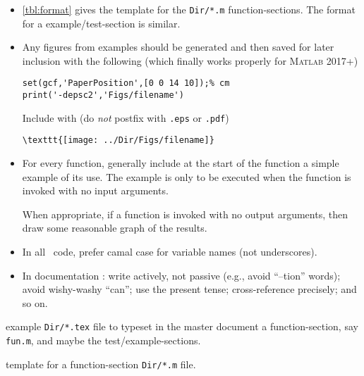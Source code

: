 \begin{itemize}
\item \autoref{tbl:format} gives the template for the \verb|Dir/*.m| function-sections.
The format for a example\slash test-section is similar.

\item Any figures from examples should be generated and then saved for later inclusion with the following (which finally works properly for \textsc{Matlab} 2017+)
\begin{verbatim}
set(gcf,'PaperPosition',[0 0 14 10]);% cm
print('-depsc2','Figs/filename')
\end{verbatim}
Include with (do \emph{not} postfix with \verb|.eps| or \verb|.pdf|)
\begin{verbatim}
\texttt{[image: ../Dir/Figs/filename]}
\end{verbatim}


\item For every function, generally include at the start of the function a simple example of its use.  The example is only to be executed when the function is invoked with no input arguments.

When appropriate, if a function is invoked with no output arguments, then draw some reasonable graph of the results.


\item In all \script\ code, prefer camal case for variable names (not underscores).


\item In documentation \cite[e.g.,][Ch.~4]{Higham98}: 
write actively, not passive (e.g., avoid ``--tion'' words);
avoid wishy-washy ``can'';
use the present tense;
cross-reference precisely;
and so on.

\end{itemize}


\begin{table}
\caption{\label{tbl:funtex}example \texttt{Dir/*.tex} file to typeset in the master document a function-section, say \texttt{fun.m}, and maybe the test\slash example-sections.}
\end{table}
\begin{table}
\caption{\label{tbl:format}template for a function-section \texttt{Dir/*.m} file.}
\end{table}


